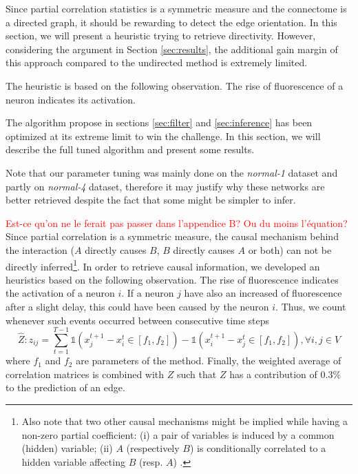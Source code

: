 \documentclass[wcp]{jmlr}
\begin{document}
Since partial correlation statistics is a symmetric measure and the connectome is a directed graph, it should be rewarding to detect the edge orientation. In this section, we will present a heuristic trying to retrieve directivity. However, considering the argument in Section \ref{sec:results}, the additional gain margin of this approach compared to the undirected method is extremely limited.

The heuristic is based on the following observation. The rise of fluorescence of a neuron indicates its activation. 



%


\vspace{5cm}







The algorithm propose in sections \ref{sec:filter} and \ref{sec:inference} has been optimized at its extreme limit to win the challenge. In this section, we will describe the full tuned algorithm and present some results.

Note that our parameter tuning was mainly
done on the \textit{normal-1} dataset and partly on \textit{normal-4} dataset,
therefore it may justify why these networks are better retrieved despite the
fact that some might be simpler to infer.

\textcolor{red}{Est-ce qu'on ne le ferait pas passer dans l'appendice B? Ou du moins l'équation?}
Since partial correlation is a symmetric measure, the causal mechanism behind the
interaction ($A$ directly causes $B$, $B$ directly causes $A$ or both) can not
be directly inferred\footnote{Also note that two other causal mechanisms might be
implied while having a non-zero partial coefficient: (i) a pair of variables
is induced by a common (hidden) variable; (ii) $A$ (respectively $B$) is
conditionally correlated to a hidden variable affecting $B$ (resp. $A$)
\citep{de2004discovery}.}.
In order to retrieve causal information, we developed an
heuristics based on the following observation. The rise of fluorescence
indicates the activation of a neuron $i$. If a neuron $j$ have also
an increased of fluorescence after a slight delay, this could have been
caused by the neuron $i$. Thus, we count whenever
such events occurred between consecutive time steps
\[
\hat{Z}: z_{ij} = \sum_{t=1}^{T - 1}
    \mathbb{1}(x_j^{t+1} - x_i^t \in \left[f_1, f_2 \right]) -
    \mathbb{1}(x_i^{t+1} - x_j^t \in \left[f_1, f_2 \right]), \forall i, j \in V
\]
where $f_1$ and $f_2$ are parameters of the method.
Finally, the weighted average of correlation matrices is combined with $Z$ such
that $Z$ has a contribution of $0.3\%$ to the prediction of an edge.
\end{document}
